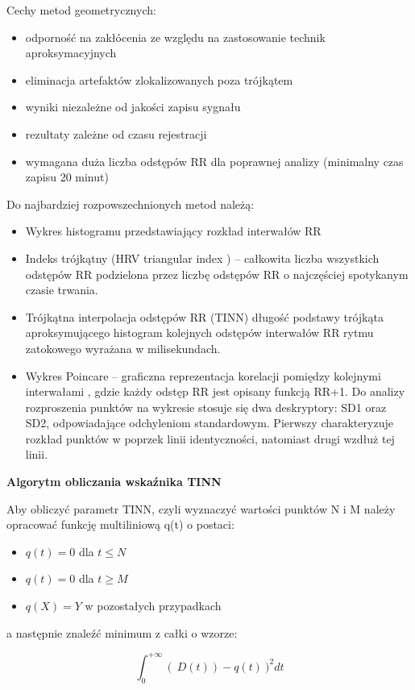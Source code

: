 \documentclass[a4paper, 11pt]{article}
\begin{document}
Cechy metod geometrycznych: 
\begin{itemize}
\item odporność na zakłócenia ze względu na zastosowanie technik aproksymacyjnych
\item eliminacja artefaktów zlokalizowanych poza trójkątem 
\item wyniki niezależne od jakości zapisu sygnału 
\item rezultaty zależne od czasu rejestracji 
\item wymagana duża liczba odstępów RR dla poprawnej analizy (minimalny
czas zapisu \textendash{} 20 minut) 
\end{itemize}
Do najbardziej rozpowszechnionych metod należą: 
\begin{itemize}
\item Wykres histogramu przedstawiający rozkład interwałów RR
\item Indeks trójkątny (HRV triangular index )  -- całkowita liczba wszystkich
odstępów RR podzielona przez liczbę odstępów RR o najczęściej spotykanym
czasie trwania. 
\item Trójkątna interpolacja odstępów RR (TINN) \textendash{} długość podstawy
trójkąta aproksymującego histogram kolejnych odstępów interwałów RR
rytmu zatokowego wyrażana w milisekundach. 
\item Wykres Poincare  -- graficzna reprezentacja korelacji pomiędzy kolejnymi
interwałami , gdzie każdy odstęp RR jest opisany funkcją RR+1. Do
analizy rozproszenia punktów na wykresie stosuje się dwa deskryptory:
SD1 oraz SD2, odpowiadające odchyleniom standardowym. Pierwszy charakteryzuje
rozkład punktów w poprzek linii identyczności, natomiast drugi wzdłuż
tej linii.
\end{itemize}
\textbf{Algorytm obliczania wskaźnika TINN \cite{hrv2-eng}}

Aby obliczyć parametr TINN, czyli wyznaczyć wartości punktów N i M
należy opracować funkcję multiliniową q(t) o postaci:
\begin{itemize}
\item $q(t) = 0$ dla \ensuremath{t \le N}
\item $q(t) = 0$ dla \ensuremath{t \ge M} 
\item $q(X) = Y$ w pozostałych przypadkach
\end{itemize}
a następnie znaleźć minimum z całki o wzorze:

\begin{equation}
\int_{0}^{+\infty}\left(\: D(t)\right)-q(t)\:)^{2}dt
\end{equation}
\end{document}
